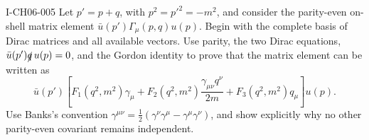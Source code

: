 \begin{exercise}{I-CH06-005}
Let \(p'=p+q\), with \(p^2=p'^2=-m^2\), and consider the parity-even
on-shell matrix element \(\bar u(p')\Gamma_\mu(p,q)u(p)\).  Begin with the
complete basis of Dirac matrices and all available vectors.  Use parity,
the two Dirac equations, \(\bar u(p')\slashed q\,u(p)=0\), and the Gordon
identity to prove that the matrix element can be written as
\[
 \bar u(p')\left[
 F_1(q^2,m^2)\gamma_\mu
 +F_2(q^2,m^2)\frac{\gamma_{\mu\nu}q^\nu}{2m}
 +F_3(q^2,m^2)q_\mu\right]u(p).
\]
Use Banks's convention
\(\gamma^{\mu\nu}=\tfrac12(\gamma^\nu\gamma^\mu-
\gamma^\mu\gamma^\nu)\), and show explicitly why no other parity-even
covariant remains independent.
\end{exercise}

